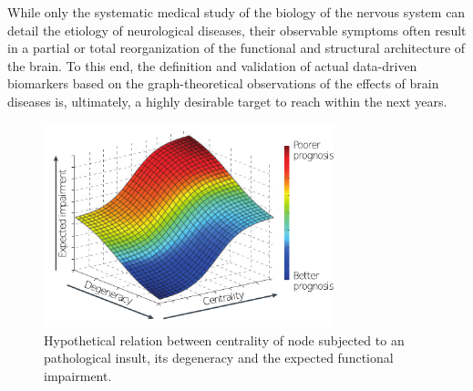 While only the systematic medical study of the biology of the nervous system can detail the etiology of neurological diseases, their observable symptoms often result in a partial or total reorganization of the functional and structural architecture of the brain. To this end, the definition and validation of actual data-driven biomarkers based on the graph-theoretical observations of the effects of brain diseases is, ultimately, a highly desirable target to reach within the next years.

\begin{figure}[htb!]
\centering
\includegraphics[width=0.75\textwidth]{images/prognosis.pdf}
\caption{Hypothetical relation between centrality of node subjected to an pathological insult, its degeneracy and the expected functional impairment.}
\label{fig:prognosis_centrality}
\end{figure}


